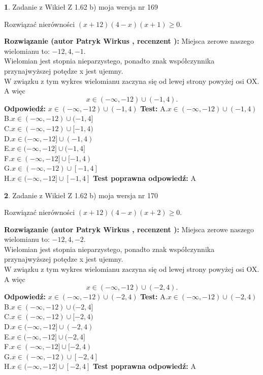 \documentclass[12pt, a4paper]{article}
\theoremstyle{definition} %
\newtheorem{zad}{}
\newcommand{\zadStart}[1]{\begin{zad}#1\newline}
\newcommand{\zadStop}{\end{zad}}
\newcommand{\rozwStart}[2]{\noindent \textbf{Rozwiązanie (autor #1 , recenzent #2): }\newline}
\newcommand{\rozwStop}{\newline}
\newcommand{\odpStart}{\noindent \textbf{Odpowiedź:}\newline}
\newcommand{\odpStop}{\newline}
\newcommand{\testStart}{\noindent \textbf{Test:}\newline}
\newcommand{\testStop}{\newline}
\newcommand{\kluczStart}{\noindent \textbf{Test poprawna odpowiedź:}\newline}
\newcommand{\kluczStop}{\newline}
\begin{document}
\zadStart{Zadanie z Wikieł Z 1.62 b) moja wersja nr 169}

Rozwiązać nierówności $(x+12)(4-x)(x+1)\ge0$.
\zadStop
\rozwStart{Patryk Wirkus}{}
Miejsca zerowe naszego wielomianu to: $-12, 4, -1$.\\
Wielomian jest stopnia nieparzystego, ponadto znak współczynnika przy\linebreak najwyższej potędze x jest ujemny.\\ W związku z tym wykres wielomianu zaczyna się od lewej strony powyżej osi OX. A więc $$x \in (-\infty,-12) \cup (-1,4).$$
\rozwStop
\odpStart
$x \in (-\infty,-12) \cup (-1,4)$
\odpStop
\testStart
A.$x \in (-\infty,-12) \cup (-1,4)$\\
B.$x \in (-\infty,-12) \cup (-1,4]$\\
C.$x \in (-\infty,-12) \cup [-1,4)$\\
D.$x \in (-\infty,-12] \cup (-1,4)$\\
E.$x \in (-\infty,-12] \cup (-1,4]$\\
F.$x \in (-\infty,-12] \cup [-1,4)$\\
G.$x \in (-\infty,-12) \cup [-1,4]$\\
H.$x \in (-\infty,-12] \cup [-1,4]$
\testStop
\kluczStart
A
\kluczStop



\zadStart{Zadanie z Wikieł Z 1.62 b) moja wersja nr 170}

Rozwiązać nierówności $(x+12)(4-x)(x+2)\ge0$.
\zadStop
\rozwStart{Patryk Wirkus}{}
Miejsca zerowe naszego wielomianu to: $-12, 4, -2$.\\
Wielomian jest stopnia nieparzystego, ponadto znak współczynnika przy\linebreak najwyższej potędze x jest ujemny.\\ W związku z tym wykres wielomianu zaczyna się od lewej strony powyżej osi OX. A więc $$x \in (-\infty,-12) \cup (-2,4).$$
\rozwStop
\odpStart
$x \in (-\infty,-12) \cup (-2,4)$
\odpStop
\testStart
A.$x \in (-\infty,-12) \cup (-2,4)$\\
B.$x \in (-\infty,-12) \cup (-2,4]$\\
C.$x \in (-\infty,-12) \cup [-2,4)$\\
D.$x \in (-\infty,-12] \cup (-2,4)$\\
E.$x \in (-\infty,-12] \cup (-2,4]$\\
F.$x \in (-\infty,-12] \cup [-2,4)$\\
G.$x \in (-\infty,-12) \cup [-2,4]$\\
H.$x \in (-\infty,-12] \cup [-2,4]$
\testStop
\kluczStart
A
\kluczStop
\end{document}
